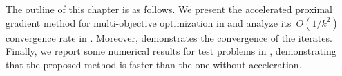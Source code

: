 \documentclass[../main]{subfiles}
\begin{document}
The outline of this chapter is as follows.
We present the accelerated proximal gradient method for multi-objective optimization in  and analyze its~$O(1 / k^2)$ convergence rate in .
Moreover,  demonstrates the convergence of the iterates.
Finally, we report some numerical results for test problems in , demonstrating that the proposed method is faster than the one without acceleration.
\end{document}
